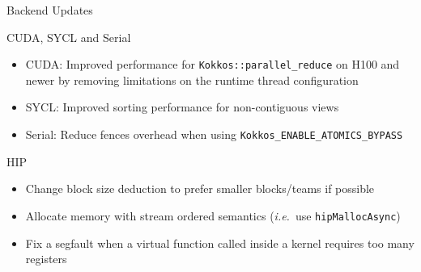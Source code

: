 
\begin{frame}[fragile]

  {\Huge Backend Updates}

  \vspace{10pt}

\end{frame}





\begin{frame}[fragile]{CUDA, SYCL and Serial}
  \begin{itemize}
      \item CUDA: Improved performance for \texttt{Kokkos::parallel\_reduce} on H100 and newer by removing limitations on the runtime thread configuration
      \item SYCL: Improved sorting performance for non-contiguous views
      \item Serial: Reduce fences overhead when using \texttt{Kokkos\_ENABLE\_ATOMICS\_BYPASS}
  \end{itemize}
\end{frame}

\begin{frame}[fragile]{HIP}
  \begin{itemize}
      \item Change block size deduction to prefer smaller blocks/teams if possible
      \item Allocate memory with stream ordered semantics (\emph{i.e.}\ use \texttt{hipMallocAsync})
      \item Fix a segfault when a virtual function called inside a kernel requires too many registers
  \end{itemize}
\end{frame}




